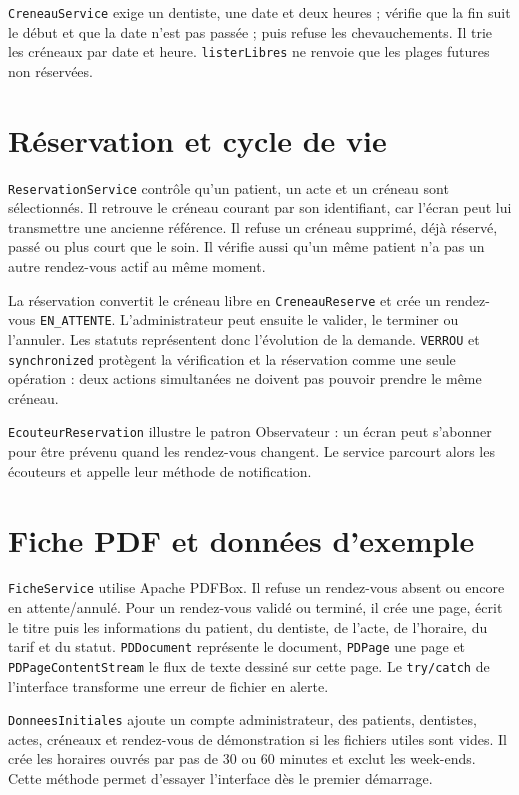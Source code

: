 \documentclass[11pt,a4paper]{report}
\begin{document}
\texttt{CreneauService} exige un dentiste, une date et deux heures ; vérifie que la fin suit le début et que la date n'est pas passée ; puis refuse les chevauchements. Il trie les créneaux par date et heure. \texttt{listerLibres} ne renvoie que les plages futures non réservées.

\section{Réservation et cycle de vie}
\texttt{ReservationService} contrôle qu'un patient, un acte et un créneau sont sélectionnés. Il retrouve le créneau courant par son identifiant, car l'écran peut lui transmettre une ancienne référence. Il refuse un créneau supprimé, déjà réservé, passé ou plus court que le soin. Il vérifie aussi qu'un même patient n'a pas un autre rendez-vous actif au même moment.

La réservation convertit le créneau libre en \texttt{CreneauReserve} et crée un rendez-vous \texttt{EN\_ATTENTE}. L'administrateur peut ensuite le valider, le terminer ou l'annuler. Les statuts représentent donc l'évolution de la demande. \texttt{VERROU} et \texttt{synchronized} protègent la vérification et la réservation comme une seule opération : deux actions simultanées ne doivent pas pouvoir prendre le même créneau.

\texttt{EcouteurReservation} illustre le patron Observateur : un écran peut s'abonner pour être prévenu quand les rendez-vous changent. Le service parcourt alors les écouteurs et appelle leur méthode de notification.

\section{Fiche PDF et données d'exemple}
\texttt{FicheService} utilise Apache PDFBox. Il refuse un rendez-vous absent ou encore en attente/annulé. Pour un rendez-vous validé ou terminé, il crée une page, écrit le titre puis les informations du patient, du dentiste, de l'acte, de l'horaire, du tarif et du statut. \texttt{PDDocument} représente le document, \texttt{PDPage} une page et \texttt{PDPageContentStream} le flux de texte dessiné sur cette page. Le \texttt{try/catch} de l'interface transforme une erreur de fichier en alerte.

\texttt{DonneesInitiales} ajoute un compte administrateur, des patients, dentistes, actes, créneaux et rendez-vous de démonstration si les fichiers utiles sont vides. Il crée les horaires ouvrés par pas de 30 ou 60 minutes et exclut les week-ends. Cette méthode permet d'essayer l'interface dès le premier démarrage.
\end{document}
